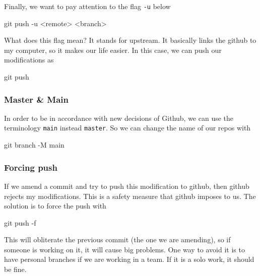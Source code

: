 Finally, we want to pay attention to the flag \verb|-u| below
\begin{listing}{1}
git push -u <remote> <branch>
\end{listing}
What does this flag mean? It stands for upstream. It basically links the github to my computer, 
so it makes our life easier. In this case, we can push our modifications as
\begin{listing}{1}
git push 
\end{listing}

\subsubsection{Master \& Main}

In order to be in accordance with new decisions of Github, we can use the terminology \verb|main| 
instead \verb|master|. So we can change the name of our repos with 
\begin{listing}{1}
git branch -M main
\end{listing}

\subsubsection{Forcing push}

If we amend a commit and try to push this modification to github, then github 
rejects my modifications. This is a safety measure that github imposes to us. 
The solution is to force the push with 
\begin{listing}
git push -f
\end{listing}
This will obliterate the previous commit (the one we are amending), so if 
someone is working on it, it will cause big problems. One way to avoid it 
is to have personal branches if we are working in a team. If it is a solo 
work, it should be fine. 




